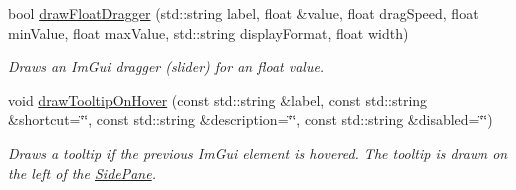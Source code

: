 \begin{DoxyCompactItemize}
\mbox{\label{classpepr3d_1_1_side_pane_a67b9ac3cbdcbae622df47cf7fa7fe0d0}} 
bool \mbox{\hyperlink{classpepr3d_1_1_side_pane_a67b9ac3cbdcbae622df47cf7fa7fe0d0}{draw\+Float\+Dragger}} (std\+::string label, float \&value, float drag\+Speed, float min\+Value, float max\+Value, std\+::string display\+Format, float width)
\begin{DoxyCompactList}\small\item\em Draws an Im\+Gui dragger (slider) for an float value. \end{DoxyCompactList}\item 
\mbox{\label{classpepr3d_1_1_side_pane_ad2aec2dd5fb2b89689af2478547c58c5}} 
void \mbox{\hyperlink{classpepr3d_1_1_side_pane_ad2aec2dd5fb2b89689af2478547c58c5}{draw\+Tooltip\+On\+Hover}} (const std\+::string \&label, const std\+::string \&shortcut=\char`\"{}\char`\"{}, const std\+::string \&description=\char`\"{}\char`\"{}, const std\+::string \&disabled=\char`\"{}\char`\"{})
\begin{DoxyCompactList}\small\item\em Draws a tooltip if the previous Im\+Gui element is hovered. The tooltip is drawn on the left of the \mbox{\hyperlink{classpepr3d_1_1_side_pane}{Side\+Pane}}. \end{DoxyCompactList}\end{DoxyCompactItemize}
